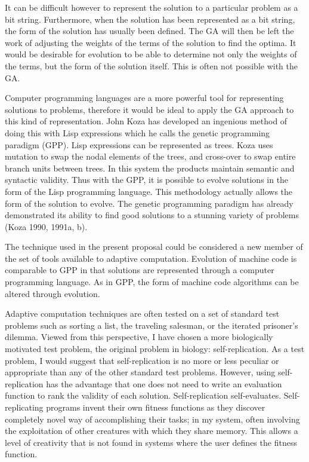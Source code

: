 It can be difficult however to represent the solution to a particular problem
as a bit string.  Furthermore, when the solution has been represented as a
bit string, the form of the solution has usually been defined.  The GA will
then be left the work of adjusting the weights of the terms of the solution
to find the optima.  It would be desirable for evolution to be able to
determine not only the weights of the terms, but the form of the solution
itself.  This is often not possible with the GA.

Computer programming languages are a more powerful tool for representing
solutions to problems, therefore it would be ideal to apply the GA approach
to this kind of representation.  John Koza has developed an ingenious method
of doing this with Lisp expressions which he calls the genetic programming
paradigm (GPP).  Lisp expressions can be represented as trees.  Koza uses
mutation to swap the nodal elements of the trees, and cross-over to swap
entire branch units between trees.  In this system the products maintain
semantic and syntactic validity.  Thus with the GPP, it is possible to
evolve solutions in the form of the Lisp programming language.  This
methodology actually allows the form of the solution to evolve.  The genetic
programming paradigm has already demonstrated its ability to find good
solutions to a stunning variety of problems (Koza 1990, 1991a, b).

The technique used in the present proposal could be considered a new member
of the set of tools available to adaptive computation.  Evolution of machine
code is comparable to GPP in that solutions are represented through
a computer programming language.  As in GPP, the form of machine code
algorithms can be altered through evolution.

Adaptive computation techniques are often tested on a set of standard test
problems such as sorting a list, the traveling salesman, or the iterated
prisoner's dilemma.  Viewed from this perspective, I have chosen a more
biologically motivated test problem, the original problem in biology:
self-replication.  As a test problem, I would suggest that self-replication
is no more or less peculiar or appropriate than any of the other standard
test problems.  However, using self-replication has the advantage that one
does not need to write an evaluation function to rank the validity of each
solution.  Self-replication self-evaluates.  Self-replicating programs invent
their own fitness functions as they discover completely novel way of
accomplishing their tasks; in my system, often involving the exploitation of
other creatures with which they share memory.  This allows a level of
creativity that is not found in systems where the user defines the fitness
function.

